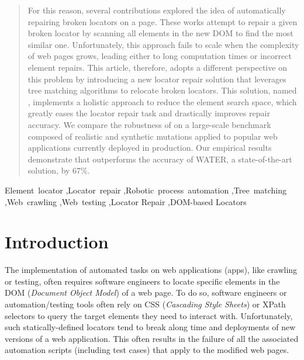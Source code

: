 \documentclass[preprint, 12pt]{elsarticle}
\begin{document}
\begin{abstract}
For this reason, several contributions explored the idea of automatically repairing broken locators on a page. 
These works attempt to repair a given broken locator by scanning all elements in the new DOM to find the most similar one.
Unfortunately, this approach fails to scale when the complexity of web pages grows, leading either to long computation times or incorrect element repairs.
% 
This article, therefore, adopts a different perspective on this problem by introducing a new locator repair solution that leverages tree matching algorithms to relocate broken locators.
This solution, named \erratum{}, implements a holistic approach to reduce the element search space, which greatly eases the locator repair task and drastically improves repair accuracy.
% 
We compare the robustness of \erratum{} on a large-scale benchmark composed of realistic and synthetic mutations applied to popular web applications currently deployed in production.
Our empirical results demonstrate that \erratum{} outperforms the accuracy of WATER, a state-of-the-art solution, by 67\%.
\end{abstract}


\begin{keyword}
Element~locator 
\sep Locator~repair 
\sep Robotic~process~automation 
\sep Tree~matching 
\sep Web~crawling 
\sep Web~testing
\sep Locator Repair
\sep DOM-based Locators
\end{keyword}

\maketitle

\section{Introduction}
The implementation of automated tasks on web applications (apps), like crawling or testing, often requires software engineers to locate specific elements in the DOM (\emph{Document Object Model}) of a web page.
To do so, software engineers or automation/testing tools often rely on CSS (\emph{Cascading Style Sheets}) or XPath selectors to query the target elements they need to interact with.
Unfortunately, such statically-defined locators tend to break along time and deployments of new versions of a web application.
This often results in the failure of all the associated automation scripts (including test cases) that apply to the modified web pages.
\end{document}

